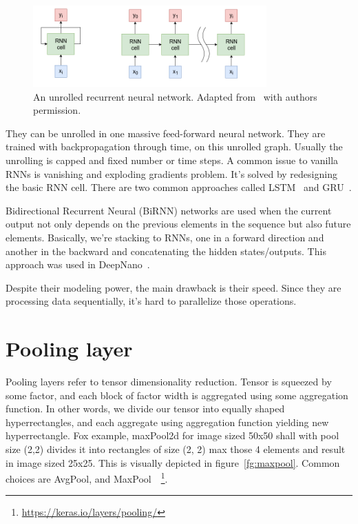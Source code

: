 \documentclass[times, utf8, diplomski, english]{fer}
\begin{document}
\begin{figure}[!ht]
    \begin{center}
        \includegraphics[width=0.8\textwidth]{rnn}
        \caption{An unrolled recurrent neural network. Adapted from~\citep{mratkovic} with authors permission.}
        \label{fg:rnn}
    \end{center}
\end{figure}


They can be unrolled in one massive feed-forward neural network. They are trained with backpropagation through time, on this unrolled graph. Usually the unrolling is capped and fixed number or time steps. 
A common issue to vanilla RNNs is vanishing and exploding gradients problem. It's solved by redesigning the basic RNN cell. There are two common approaches called LSTM~\citep{hochreiter1997long} and GRU~\citep{gru}.

Bidirectional Recurrent Neural (BiRNN) networks are used when the current output not only depends on the previous elements in the sequence but also future elements. Basically, we're stacking to RNNs, one in a forward direction and another in the backward and concatenating the hidden states/outputs. This approach was used in DeepNano~\citep{Boza2017}.

Despite their modeling power, the main drawback is their speed. Since they are processing data sequentially, it's hard to parallelize those operations. 

\section{Pooling layer}
Pooling layers refer to tensor dimensionality reduction. Tensor is squeezed by some factor, and each block of factor width is aggregated using some aggregation function. 
In other words, we divide our tensor into equally shaped hyperrectangles, and each aggregate using aggregation function yielding new hyperrectangle. 
Fox example, maxPool2d for image sized 50x50 shall with pool size (2,2) divides it into rectangles of size (2, 2) max those 4 elements and result in image sized 25x25.
This is visually depicted in figure~\ref{fg:maxpool}.
Common choices are AvgPool, and MaxPool~\citep{Scherer:2010:EPO:1886436.1886447}~\footnote{\url{https://keras.io/layers/pooling/}}.
\end{document}

